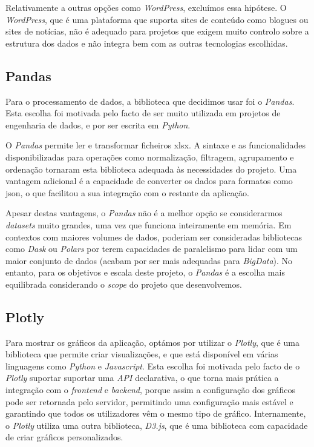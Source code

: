 Relativamente a outras opções como \textit{WordPress}, excluímos essa hipótese. O \textit{WordPress}, que é uma plataforma que suporta sites de conteúdo como blogues ou sites de notícias, não é adequado para projetos que exigem muito controlo sobre a estrutura dos dados e não integra bem com as outras tecnologias escolhidas.

\subsection{Pandas}

Para o processamento de dados, a biblioteca que decidimos usar foi o \textit{Pandas}. Esta escolha foi motivada pelo facto de ser muito utilizada em projetos de engenharia de dados, e por ser escrita em \textit{Python}.

O \textit{Pandas} permite ler e transformar ficheiros \gls{xlsx}. A sintaxe e as funcionalidades disponibilizadas para operações como normalização, filtragem, agrupamento e ordenação tornaram esta biblioteca adequada às necessidades do projeto. Uma vantagem adicional é a capacidade de converter os dados para formatos como \gls{json}, o que facilitou a sua integração com o restante da aplicação.

Apesar destas vantagens, o \textit{Pandas} não é a melhor opção se considerarmos \textit{datasets} muito grandes, uma vez que funciona inteiramente em memória. Em contextos com maiores volumes de dados, poderiam ser consideradas bibliotecas como \textit{Dask} ou \textit{Polars} por terem capacidades de paralelismo para lidar com um maior conjunto de dados (acabam por ser mais adequadas para \textit{BigData}). No entanto, para os objetivos e escala deste projeto, o \textit{Pandas} é a escolha mais equilibrada considerando o \textit{scope} do projeto que desenvolvemos.

\subsection{Plotly}

Para mostrar os gráficos da aplicação, optámos por utilizar o \textit{Plotly}, que é uma biblioteca  que permite criar visualizações, e que está disponível em várias linguagens como \textit{Python} e \textit{Javascript}. Esta escolha foi motivada pelo facto de o \textit{Plotly} suportar suportar uma \textit{API} declarativa, o que torna mais prática a integração com o \textit{frontend} e \textit{backend}, porque assim a configuração dos gráficos pode ser retornada pelo servidor, permitindo uma configuração mais estável e garantindo que todos os utilizadores vêm o mesmo tipo de gráfico. Internamente, o \textit{Plotly} utiliza uma outra biblioteca, \textit{D3.js}, que é uma biblioteca com capacidade de criar gráficos personalizados.

